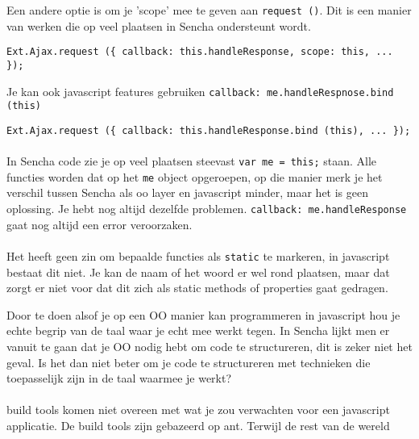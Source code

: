Een andere optie is om je 'scope' mee te geven aan \lstinline{request ()}. Dit is een
manier van werken die op veel plaatsen in Sencha ondersteunt wordt.

\begin{lstlisting}[language=ownjavascript]
Ext.Ajax.request ({ callback: this.handleResponse, scope: this, ... });
\end{lstlisting}

Je kan ook javascript features gebruiken \lstinline{callback: me.handleRespnose.bind (this)}

\begin{lstlisting}[language=ownjavascript]
Ext.Ajax.request ({ callback: this.handleResponse.bind (this), ... });
\end{lstlisting}


\paragraph {} In Sencha code zie je op veel plaatsen steevast \lstinline{var me = this;}
staan. Alle functies worden dat op het \lstinline{me} object opgeroepen, op die manier
merk je het verschil tussen Sencha als oo layer en javascript minder, maar het is geen
oplossing. Je hebt nog altijd dezelfde problemen. \lstinline{callback: me.handleResponse}
gaat nog altijd een error veroorzaken.

\paragraph {} Het heeft geen zin om bepaalde functies als \lstinline{static} te markeren,
in javascript bestaat dit niet. Je kan de naam of het woord er wel rond plaatsen, maar dat
zorgt er niet voor dat dit zich als static methods of properties gaat gedragen.

Door te doen alsof je op een OO manier kan programmeren in javascript
hou je echte begrip van de taal waar je echt mee werkt tegen. In Sencha lijkt men er
vanuit te gaan dat je OO nodig hebt om code te structureren, dit is zeker niet het geval.
Is het dan niet beter om je code te structureren met technieken die toepasselijk zijn in
de taal waarmee je werkt?


\paragraph {} build tools komen niet overeen met wat je zou verwachten voor een javascript
applicatie. De build tools zijn gebazeerd op ant. Terwijl de rest van de wereld

